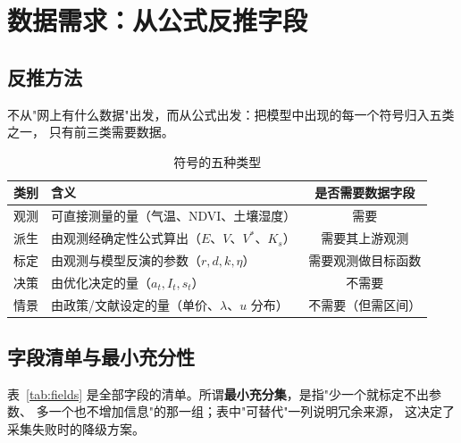 \documentclass[11pt,a4paper]{ctexart}
\begin{document}
\section{数据需求：从公式反推字段}\label{sec:data}

\subsection{反推方法}

不从"网上有什么数据"出发，而从公式出发：把模型中出现的每一个符号归入五类之一，
只有前三类需要数据。

\begin{table}[H]\centering\small
\begin{tabularx}{\textwidth}{|c|X|c|}
\toprule
类别 & 含义 & 是否需要数据字段 \\
\midrule
观测 & 可直接测量的量（气温、NDVI、土壤湿度） & 需要 \\
派生 & 由观测经确定性公式算出（$E$、$V$、$V^*$、$K_s$） & 需要其上游观测 \\
标定 & 由观测与模型反演的参数（$r,d,k,\eta$） & 需要观测做目标函数 \\
决策 & 由优化决定的量（$a_t,I_t,s_t$） & 不需要 \\
情景 & 由政策/文献设定的量（单价、$\lambda$、$u$ 分布） & 不需要（但需区间） \\
\bottomrule
\end{tabularx}
\caption{符号的五种类型}\label{tab:five}
\end{table}

\subsection{字段清单与最小充分性}

表~\ref{tab:fields} 是全部字段的清单。所谓\textbf{最小充分集}，是指"少一个就标定不出参数、
多一个也不增加信息"的那一组；表中"可替代"一列说明冗余来源，
这决定了采集失败时的降级方案。
\end{document}
